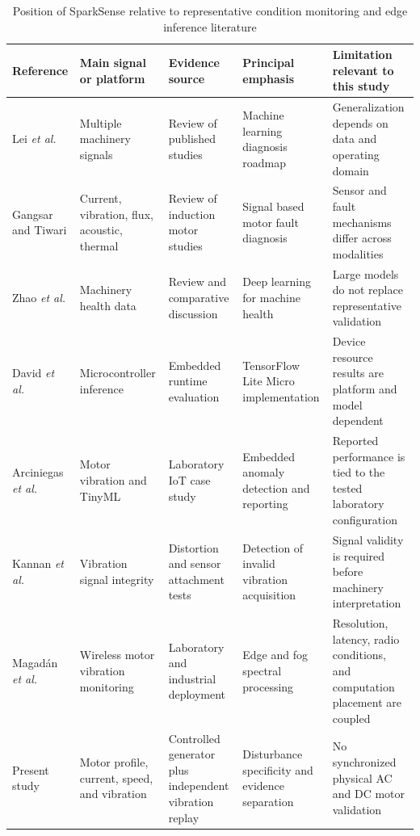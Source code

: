 \documentclass[10pt,twocolumn]{article}
\begin{document}
\begin{table}[t]
\caption{Position of SparkSense relative to representative condition monitoring and edge inference literature}
\label{tab:literature}
\centering
\footnotesize
\begin{tabularx}{0.96\textwidth}{@{}p{}p{}p{}p{}X@{}}
\toprule
Reference & Main signal or platform & Evidence source & Principal emphasis & Limitation relevant to this study \\
\midrule
Lei \emph{et al.} \cite{lei2020} & Multiple machinery signals & Review of published studies & Machine learning diagnosis roadmap & Generalization depends on data and operating domain \\
Gangsar and Tiwari \cite{gangsar2020} & Current, vibration, flux, acoustic, thermal & Review of induction motor studies & Signal based motor fault diagnosis & Sensor and fault mechanisms differ across modalities \\
Zhao \emph{et al.} \cite{zhao2019} & Machinery health data & Review and comparative discussion & Deep learning for machine health & Large models do not replace representative validation \\
David \emph{et al.} \cite{david2021} & Microcontroller inference & Embedded runtime evaluation & TensorFlow Lite Micro implementation & Device resource results are platform and model dependent \\
Arciniegas \emph{et al.} \cite{arciniegas2025} & Motor vibration and TinyML & Laboratory IoT case study & Embedded anomaly detection and reporting & Reported performance is tied to the tested laboratory configuration \\
Kannan \emph{et al.} \cite{kannan2024} & Vibration signal integrity & Distortion and sensor attachment tests & Detection of invalid vibration acquisition & Signal validity is required before machinery interpretation \\
Magadán \emph{et al.} \cite{magadan2023} & Wireless motor vibration monitoring & Laboratory and industrial deployment & Edge and fog spectral processing & Resolution, latency, radio conditions, and computation placement are coupled \\
Present study & Motor profile, current, speed, and vibration & Controlled generator plus independent vibration replay & Disturbance specificity and evidence separation & No synchronized physical AC and DC motor validation \\
\bottomrule
\end{tabularx}
\end{table}
\end{document}
